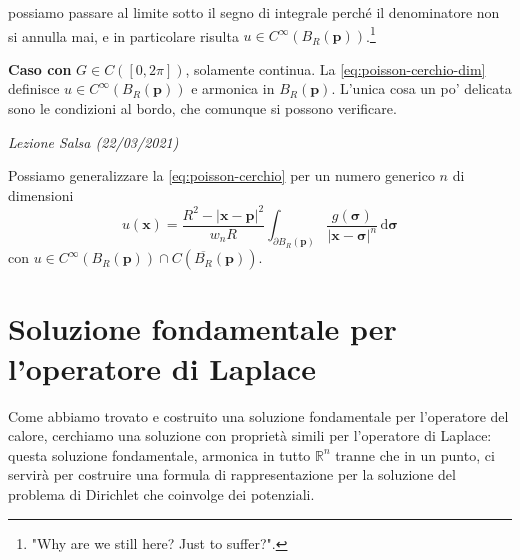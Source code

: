 \documentclass[10pt,a4paper,twoside,openright]{book}
\newcounter{conteggioS}
\newcommand{\LezioneS}[1]{
	\stepcounter{conteggioS}
	\textit{Lezione Salsa \arabic{conteggioS} (#1)}
	}
\newcommand{\x}{\mathbf{x}}
\newcommand{\sigg}{\bm{\sigma}}
\newcommand{\de}{\,\mathrm d}
\newcommand{\dsig}{\de \sigg}
\begin{document}
\begin{dimostrazione}
\begin{figure}[H]

\end{figure}
\FloatBarrier

possiamo passare al limite sotto il segno di integrale perché il denominatore non si annulla mai, e in particolare risulta $u\in C^{\infty }(B_{R}(\mathbf{p}))$.\footnote{"Why are we still here? Just to suffer?".}

\textbf{Caso con }$G\in C([0,2\pi])$, solamente continua. La \eqref{eq:poisson-cerchio-dim} definisce $u\in C^{\infty }(B_{R}(\mathbf{p}))$ e armonica in $B_{R}(\mathbf{p})$. L'unica cosa un po' delicata sono le condizioni al bordo, che comunque si possono verificare.

\end{dimostrazione}

\LezioneS{22/03/2021}

Possiamo generalizzare la \eqref{eq:poisson-cerchio} per un numero generico $n$ di dimensioni
\begin{equation*}
	u(\x) =\frac{R^{2} -| \x -\mathbf{p}| ^{2}}{w_{n} R}\int _{\partial B_{R}(\mathbf{p})}\frac{g(\sigg)}{| \x -\sigg| ^{n}} \dsig
\end{equation*}
con $\displaystyle u\in C^{\infty }(B_{R}(\mathbf{p})) \cap C\left(\overline{B_{R}}(\mathbf{p})\right)$.
\section{Soluzione fondamentale per l'operatore di Laplace}

Come abbiamo trovato e costruito una soluzione fondamentale per l'operatore del calore, cerchiamo una soluzione con proprietà simili per l'operatore di Laplace: questa soluzione fondamentale, armonica in tutto $\displaystyle \mathbb{R}^{n}$ tranne che in un punto, ci servirà per costruire una formula di rappresentazione per la soluzione del problema di Dirichlet che coinvolge dei potenziali.
\end{document}
